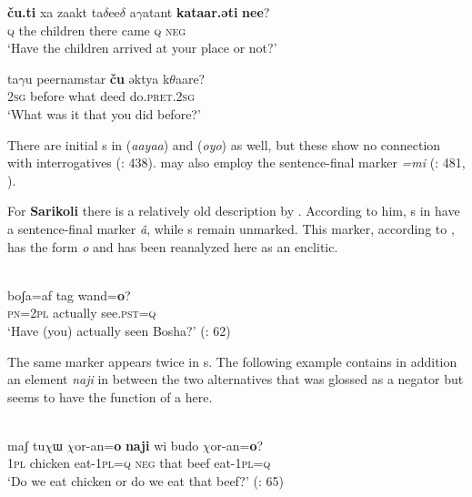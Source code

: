     \ex
    \gll \textbf{{ču.ti}} xa  zaakt    ta$\delta $ee$\delta $  a$\gamma $atant \textbf{{kataar.əti}} \textbf{{nee}}?\\
    \textsc{q}  the  children  there  came    \textsc{q}    \textsc{neg}\\
    \glt ‘Have the children arrived at your place or not?’
    
    \ex
    \gll ta$\gamma $u  peernamstar \textbf{{ču}} əktya  k$\theta $aare?\\
    2\textsc{sg}  before    what  deed  do.\textsc{pret}.2\textsc{sg}\\
    \glt ‘What was it that you did before?’ \citep[317]{Yoshida2009}
    \z
    \z 

\noindent There are initial s in  (\textit{aayaa}) and  (\textit{oyo}) as well, but these show no connection with interrogatives (\citealt{WindfuhrPerry2009}: 438).  may also employ the  sentence-final marker \textit{=mi} (\citealt{WindfuhrPerry2009}: 481, ).

For \textbf{Sarikoli} there is a relatively old description by \citet[29]{Shaw1876}. According to him, s in  have a sentence-final marker \textit{â}, while s remain unmarked. This marker, according to \citet{GaoErqiang1985}, has the form \textit{o} and has been reanalyzed here as an enclitic.

\ea%
    \label{ex:indo:31}
    \\
    \gll boʃa=af  tag    wand=\textbf{{o}}?\\
    \textsc{pn}=2\textsc{pl}  actually  see.\textsc{pst}=\textsc{q}\\
    \glt ‘Have (you) actually seen Bosha?’ (\citealt{GaoErqiang1985}: 62)
    \z

\noindent The same marker appears twice in s. The following example contains in addition an element \textit{naji} in between the two alternatives that was glossed as a negator but seems to have the function of a  here.

\ea%
    \label{ex:indo:32}
    \\
    \gll maʃ  tu$\chi $ɯ   $\chi $or-an=\textbf{{o}} \textbf{{naji}} wi  budo  $\chi $or-an=\textbf{{o}}?\\
    1\textsc{pl}  chicken  eat-1\textsc{pl}=\textsc{q}  \textsc{neg}  that  beef  eat-1\textsc{pl}=\textsc{q}\\
    \glt ‘Do we eat chicken or do we eat that beef?’ (\citealt{GaoErqiang1985}: 65)
    \z


